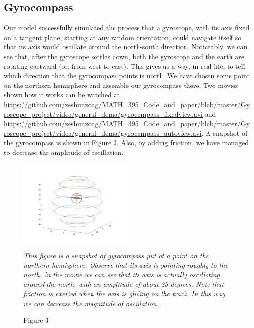\documentclass[12pt]{article}
\renewcommand{\(}{\left (}
\renewcommand{\)}{\right )}
\begin{document}
\subsection{Gyrocompass}
\hspace{5mm} Our model successfully simulated the process that a gyroscope, with its axis fixed on a tangent plane, starting at any random orientation, could navigate itself so that its axis would oscillate around the north-south direction. Noticeably, we can see that, after the gyroscope settles down, both the gyroscope and the earth are rotating eastward (or, from west to east). This gives us a way, in real life, to tell which direction that the gyrocompass points is north. We have chosen some point on the northern hemisphere and assemble our gyrocompass there. Two movies shown how it works can be watched at \url{https://github.com/zeshunzong/MATH_395_Code_and_paper/blob/master/Gyroscope_project/video/general_demo/gyrocompass_fixedview.avi} and \url{https://github.com/zeshunzong/MATH_395_Code_and_paper/blob/master/Gyroscope_project/video/general_demo/gyrocompass_autoview.avi}. A snapshot of the gyrocompass is shown in Figure 3. Also, by adding friction, we have managed to decrease the amplitude of oscillation.

\begin{figure}[ht]
	\centering
	\includegraphics[width=0.5\textwidth]{demo_pointing_north.png}		\caption*{\small Figure 3}
	\footnotesize
	\emph{This figure is a snapshot of gyrocompass put at a point on the northern hemisphere. Observe that its axis is pointing roughly to the north. In the movie we can see that its axis is actually oscillating around the north, with an amplitude of about 25 degrees. Note that friction is exerted when the axis is gliding on the track. In this way we can decrease the magnitude of oscillation.}
\end{figure}
\end{document}
